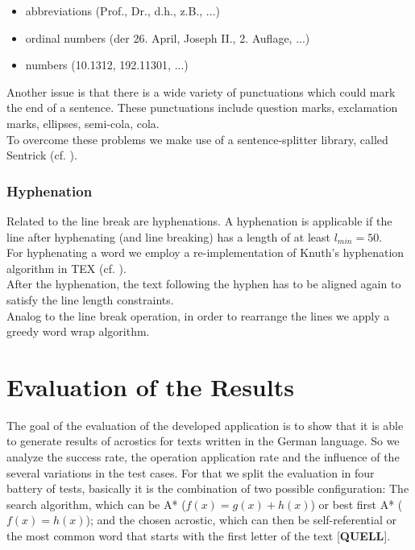 \documentclass{reportAlternative}
\begin{document}
\begin{itemize}

	\item abbreviations (Prof., Dr., d.h., z.B., ...)

	\item ordinal numbers (der 26. April, Joseph II., 2. Auflage, ...)

	\item numbers (10.1312, 192.11301, ...)

\end{itemize}
Another issue is that there is a wide variety of punctuations which could mark the end of a sentence. These punctuations include question marks, exclamation marks, ellipses, semi-cola, cola.\\
To overcome these problems we make use of a sentence-splitter library, called Sentrick (cf. \cite{Sentrick}).


\subsection{Hyphenation}
 Related to the line break are hyphenations. A hyphenation is applicable if the line after hyphenating (and line breaking) has a length of at least $l_{min}=50$.\\ For hyphenating a word we employ a re-implementation of Knuth's hyphenation algorithm in TEX (cf. \cite{Hyphenation}). \\
After the hyphenation, the text following the hyphen has to be aligned again to satisfy the line length constraints.\\
Analog to the line break operation, in order to rearrange the lines we apply a greedy word wrap algorithm.













\chapter{Evaluation of the Results}
The goal of the evaluation of the developed application is to show that it is able to generate results of acrostics for texts written in the German language. So we analyze the success rate, the operation application rate and the influence of the several variations in the test cases. For that we split the evaluation in four battery of tests, basically it is the combination of two possible configuration: The search algorithm, which can be A* ($f(x) = g(x) + h(x)$) or best first A* ($f(x) = h(x)$); and the chosen acrostic, which can then be self-referential or the most common word that starts with the first letter of the text [\textbf{QUELL}].
\end{document}
